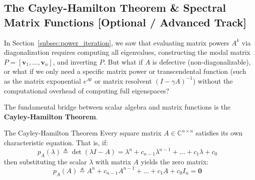 \subsection{The Cayley-Hamilton Theorem \& Spectral Matrix Functions [Optional / Advanced Track]}
\label{subsec:cayley_hamilton}

In Section~\ref{subsec:power_iteration}, we saw that evaluating matrix powers $A^k$ via diagonalization requires computing all eigenvalues, constructing the modal matrix $P = [\mathbf{v}_1, \dots, \mathbf{v}_n]$, and inverting $P$. But what if $A$ is defective (non-diagonalizable), or what if we only need a specific matrix power or transcendental function (such as the matrix exponential $e^{At}$ or matrix resolvent $(I - \gamma A)^{-1}$) without the computational overhead of computing full eigenspaces?

The fundamental bridge between scalar algebra and matrix functions is the \textbf{Cayley-Hamilton Theorem}.

\begin{theorembox}{The Cayley-Hamilton Theorem}
\label{thm:cayley_hamilton}
Every square matrix $A \in \mathbb{C}^{n \times n}$ satisfies its own characteristic equation. That is, if:
\begin{equation}
p_A(\lambda) \triangleq \det(\lambda I - A) = \lambda^n + c_{n-1} \lambda^{n-1} + \dots + c_1 \lambda + c_0
\label{eq:char_poly_form}
\end{equation}
then substituting the scalar $\lambda$ with matrix $A$ yields the zero matrix:
\begin{equation}
p_A(A) \triangleq A^n + c_{n-1} A^{n-1} + \dots + c_1 A + c_0 I_n = \mathbf{0}
\label{eq:cayley_hamilton_identity}
\end{equation}
\end{theorembox}

